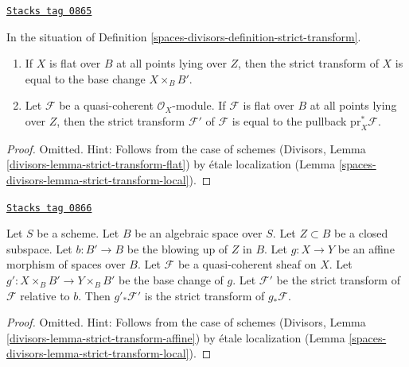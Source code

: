 \begin{lemma}
\label{spaces-divisors-lemma-strict-transform-flat}
\href{https://stacks.math.columbia.edu/tag/0865}{\texttt{Stacks tag 0865}}

In the situation of Definition \ref{spaces-divisors-definition-strict-transform}.
\begin{enumerate}
\item If $X$ is flat over $B$ at all points lying over $Z$, then
the strict transform of $X$ is equal to the base change $X \times_B B'$.
\item Let $\mathcal{F}$ be a quasi-coherent $\mathcal{O}_X$-module.
If $\mathcal{F}$ is flat over $B$ at all points lying over $Z$, then
the strict transform $\mathcal{F}'$ of $\mathcal{F}$ is equal to the
pullback $\text{pr}_X^*\mathcal{F}$.
\end{enumerate}
\end{lemma}

\begin{proof}
Omitted. Hint: Follows from the case of schemes
(Divisors, Lemma \ref{divisors-lemma-strict-transform-flat})
by \'etale localization
(Lemma \ref{spaces-divisors-lemma-strict-transform-local}).
\end{proof}

\begin{lemma}
\label{spaces-divisors-lemma-strict-transform-affine}
\href{https://stacks.math.columbia.edu/tag/0866}{\texttt{Stacks tag 0866}}

Let $S$ be a scheme. Let $B$ be an algebraic space over $S$.
Let $Z \subset B$ be a closed subspace.
Let $b : B' \to B$ be the blowing up of $Z$ in $B$. Let
$g : X \to Y$ be an affine morphism of spaces over $B$.
Let $\mathcal{F}$ be a quasi-coherent sheaf on $X$.
Let $g' : X \times_B B' \to Y \times_B B'$ be the base change
of $g$. Let $\mathcal{F}'$ be the strict transform of $\mathcal{F}$
relative to $b$. Then $g'_*\mathcal{F}'$ is the strict transform
of $g_*\mathcal{F}$.
\end{lemma}

\begin{proof}
Omitted. Hint: Follows from the case of schemes
(Divisors, Lemma \ref{divisors-lemma-strict-transform-affine})
by \'etale localization (Lemma \ref{spaces-divisors-lemma-strict-transform-local}).
\end{proof}

